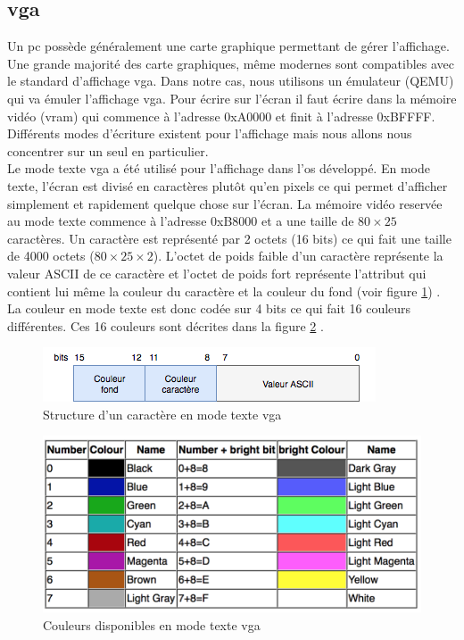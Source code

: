 \subsection{\acrshort{vga}}
Un \acrshort{pc} possède généralement une carte graphique permettant de gérer
l'affichage. Une grande majorité des carte graphiques, même modernes sont compatibles
avec le standard d'affichage \acrshort{vga}. Dans notre cas, nous utilisons un
émulateur (QEMU) qui va émuler l'affichage \acrshort{vga}. Pour écrire sur l'écran
il faut écrire dans la mémoire vidéo (\acrshort{vram}) qui commence à l'adresse
0xA0000 et finit à l'adresse 0xBFFFF. Différents modes d'écriture existent pour
l'affichage mais nous allons nous concentrer sur un seul en particulier. \\

Le mode texte \acrshort{vga} a été utilisé pour l'affichage dans l'\acrshort{os}
développé. En mode texte, l'écran est divisé en caractères plutôt qu'en pixels ce
qui permet d'afficher simplement et rapidement quelque chose sur l'écran. La mémoire
vidéo reservée au mode texte commence à l'adresse 0xB8000 et a une taille de
$80 \times 25$ caractères. Un caractère est représenté par 2 octets (16 bits) ce
qui fait une taille de 4000 octets ($80 \times 25 \times 2$). L'octet de poids
faible d'un caractère représente la valeur ASCII de ce caractère et l'octet de poids
fort représente l'attribut qui contient lui même la couleur du caractère et la
couleur du fond (voir figure \ref{vga_char}) \cite{ref42}. La couleur en mode texte
est donc codée sur 4 bits ce qui fait 16 couleurs différentes. Ces 16 couleurs sont
décrites dans la figure \ref{colors} \cite{ref19}. \\

\begin{figure}[!h]
  \centering
  \includegraphics[scale=0.8]{images/vga_char.png}
  \caption{Structure d'un caractère en mode texte \acrshort{vga}}
  \label{vga_char}
\end{figure}

\begin{figure}[!h]
  \centering
  \includegraphics[scale=0.65]{images/colors.png}
  \caption{Couleurs disponibles en mode texte \acrshort{vga}}
  \label{colors}
\end{figure}

